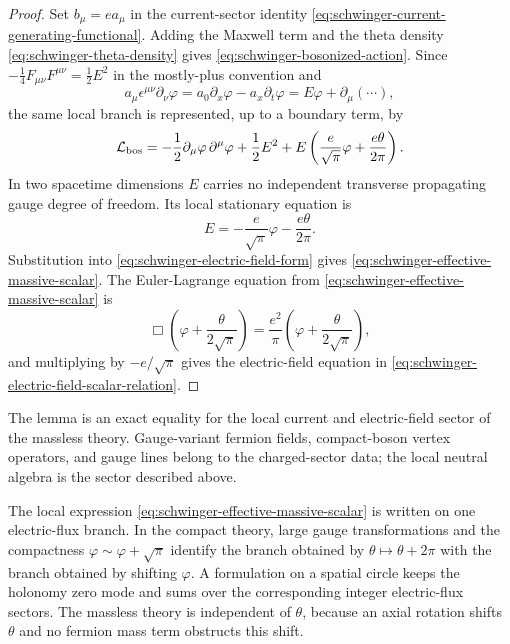 \begin{proof}
Set \(b_\mu=e a_\mu\) in the current-sector identity
\eqref{eq:schwinger-current-generating-functional}.  Adding the Maxwell term
and the theta density \eqref{eq:schwinger-theta-density} gives
\eqref{eq:schwinger-bosonized-action}.  Since
\(-\frac14F_{\mu\nu}F^{\mu\nu}=\frac12E^2\) in the mostly-plus convention and
\[
  a_\mu\epsilon^{\mu\nu}\partial_\nu\varphi
  =
  a_0\partial_x\varphi-a_x\partial_t\varphi
  =
  E\varphi+\partial_\mu(\cdots),
\]
the same local branch is represented, up to a boundary term, by
\begin{equation}
  \mathcal L_{\rm bos}
  =
  -\frac12\partial_\mu\varphi\,\partial^\mu\varphi
  +\frac12E^2
  +E\left(\frac{e}{\sqrt\pi}\varphi+\frac{e\theta}{2\pi}\right).
  \label{eq:schwinger-electric-field-form}
\end{equation}
In two spacetime dimensions \(E\) carries no independent transverse
propagating gauge degree of freedom.  Its local stationary equation is
\[
  E
  =
  -\frac{e}{\sqrt\pi}\varphi-\frac{e\theta}{2\pi}.
\]
Substitution into \eqref{eq:schwinger-electric-field-form} gives
\eqref{eq:schwinger-effective-massive-scalar}.  The Euler-Lagrange equation
from \eqref{eq:schwinger-effective-massive-scalar} is
\[
  \Box\!\left(\varphi+\frac{\theta}{2\sqrt\pi}\right)
  =
  \frac{e^2}{\pi}
  \left(\varphi+\frac{\theta}{2\sqrt\pi}\right),
\]
and multiplying by \(-e/\sqrt\pi\) gives the electric-field equation in
\eqref{eq:schwinger-electric-field-scalar-relation}.
\end{proof}

The lemma is an exact equality for the local current and electric-field
sector of the massless theory.  Gauge-variant fermion fields, compact-boson
vertex operators, and gauge lines belong to the charged-sector data; the local
neutral algebra is the sector described above.

\begin{remark}
  The local expression \eqref{eq:schwinger-effective-massive-scalar} is
  written on one electric-flux branch.  In the compact theory, large gauge
  transformations and the compactness
  \(\varphi\sim\varphi+\sqrt\pi\) identify the branch obtained by
  \(\theta\mapsto\theta+2\pi\) with the branch obtained by shifting
  \(\varphi\).  A formulation on a spatial circle keeps the holonomy zero
  mode and sums over the corresponding integer electric-flux sectors.  The
  massless theory is independent of \(\theta\), because an axial rotation
  shifts \(\theta\) and no fermion mass term obstructs this shift.
\end{remark}

